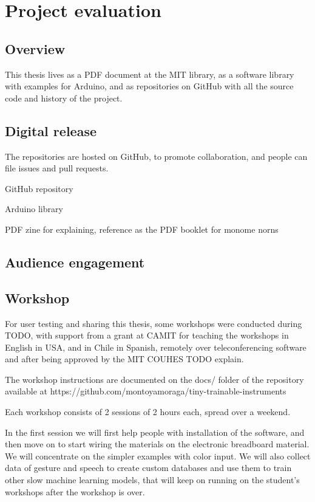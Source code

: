 \chapter{Project evaluation}

\section{Overview}

This thesis lives as a PDF document at the MIT library, as a software library with examples for Arduino, and as repositories on GitHub with all the source code and history of the project.

\section{Digital release}

The repositories are hosted on GitHub, to promote collaboration, and people can file issues and pull requests.

GitHub repository

Arduino library

PDF zine for explaining, reference as the PDF booklet for monome norns

\section{Audience engagement}


\section{Workshop}

For user testing and sharing this thesis, some workshops were conducted during TODO, with support from a grant at CAMIT for teaching the workshops in English in USA, and in Chile in Spanish, remotely over teleconferencing software and after being approved by the MIT COUHES TODO explain.

The workshop instructions are documented on the docs/ folder of the repository available at https://github.com/montoyamoraga/tiny-trainable-instruments

Each workshop consists of 2 sessions of 2 hours each, spread over a weekend.

In the first session we will first help people with installation of the software, and then move on to start wiring the materials on the electronic breadboard material. We will concentrate on the simpler examples with color input. We will also collect data of gesture and speech to create custom databases and use them to train other slow machine learning models, that will keep on running on the student's workshops after the workshop is over.

